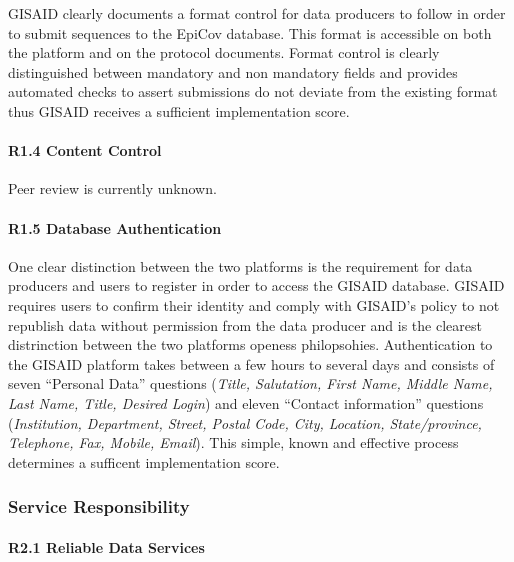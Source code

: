 \documentclass{article}
\begin{document}
GISAID clearly documents a format control for data producers to follow
in order to submit sequences to the EpiCov database. This format is
accessible on both the platform and on the protocol documents. Format
control is clearly distinguished between mandatory and non mandatory
fields and provides automated checks to assert submissions do not
deviate from the existing format thus GISAID receives a sufficient
implementation score.

\hypertarget{r1.4-content-control}{%
\paragraph{R1.4 Content Control}\label{r1.4-content-control}}

Peer review is currently unknown.

\hypertarget{r1.5-database-authentication}{%
\paragraph{R1.5 Database
Authentication}\label{r1.5-database-authentication}}

One clear distinction between the two platforms is the requirement for
data producers and users to register in order to access the GISAID
database. GISAID requires users to confirm their identity and comply
with GISAID's policy to not republish data without permission from the
data producer and is the clearest distrinction between the two platforms
openess philopsohies. Authentication to the GISAID platform takes
between a few hours to several days and consists of seven ``Personal
Data'' questions (\emph{Title, Salutation, First Name, Middle Name, Last
Name, Title, Desired Login}) and eleven ``Contact information''
questions (\emph{Institution, Department, Street, Postal Code, City,
Location, State/province, Telephone, Fax, Mobile, Email}). This simple,
known and effective process determines a sufficent implementation score.

\hypertarget{service-responsibility-1}{%
\subsubsection{Service Responsibility}\label{service-responsibility-1}}

\hypertarget{r2.1-reliable-data-services}{%
\paragraph{R2.1 Reliable Data
Services}\label{r2.1-reliable-data-services}}
\end{document}
